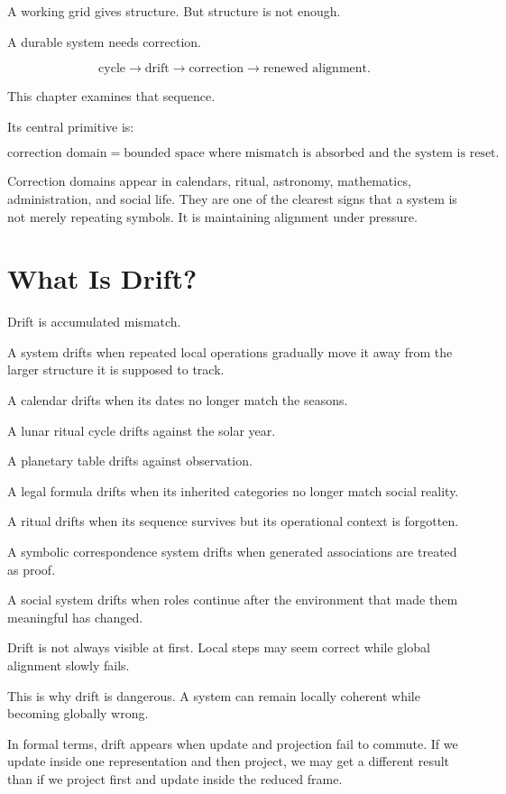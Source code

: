 \documentclass[11pt]{book}
\begin{document}
A working grid gives structure. But structure is not enough.

A durable system needs correction.

\[
\text{cycle}
\rightarrow
\text{drift}
\rightarrow
\text{correction}
\rightarrow
\text{renewed alignment}.
\]

This chapter examines that sequence.

Its central primitive is:

\[
\text{correction domain} = \text{bounded space where mismatch is absorbed and the system is reset}.
\]

Correction domains appear in calendars, ritual, astronomy, mathematics, administration, and social life. They are one of the clearest signs that a system is not merely repeating symbols. It is maintaining alignment under pressure.

\section{What Is Drift?}

Drift is accumulated mismatch.

A system drifts when repeated local operations gradually move it away from the larger structure it is supposed to track.

A calendar drifts when its dates no longer match the seasons.

A lunar ritual cycle drifts against the solar year.

A planetary table drifts against observation.

A legal formula drifts when its inherited categories no longer match social reality.

A ritual drifts when its sequence survives but its operational context is forgotten.

A symbolic correspondence system drifts when generated associations are treated as proof.

A social system drifts when roles continue after the environment that made them meaningful has changed.

Drift is not always visible at first. Local steps may seem correct while global alignment slowly fails.

This is why drift is dangerous. A system can remain locally coherent while becoming globally wrong.

In formal terms, drift appears when update and projection fail to commute. If we update inside one representation and then project, we may get a different result than if we project first and update inside the reduced frame.
\end{document}
